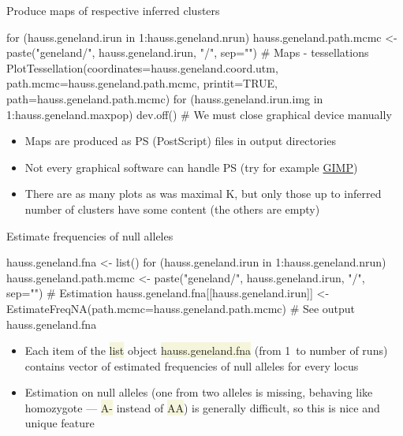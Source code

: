 \documentclass[compress, ucs, xelatex, 11pt, xcolor=svgnames, aspectratio=169,
	hyperref={
		bookmarks=true,
		unicode=true,
		colorlinks=true,
		pdftitle={Molecular data in R},
		plainpages=false,
		pdfauthor={Vojtech Zeisek},
		pdfsubject={Course about phylogeny and evolution in R},
		pdfcreator={XeLaTeX},
		pdfkeywords={R, evolution, phylogeny, molecular data},
		linkcolor=Crimson, %
		anchorcolor=Magenta, %
		citecolor=Magenta, %
		filecolor=Magenta, %
		menucolor=Magenta, %
		urlcolor=DodgerBlue, %
		pdftex},
	url={hyphens, lowtilde} %
	]{beamer}
\renewcommand{\texttt}[1]{\colorbox{Beige}{{\ttfamily #1}}}
\begin{document}
\begin{frame}[fragile]{Produce maps of respective inferred clusters}
	\begin{spluscode}
    for (hauss.geneland.irun in 1:hauss.geneland.nrun) {
      hauss.geneland.path.mcmc <- paste("geneland/",
        hauss.geneland.irun, "/", sep="")
      # Maps - tessellations
      PlotTessellation(coordinates=hauss.geneland.coord.utm,
        path.mcmc=hauss.geneland.path.mcmc, printit=TRUE,
        path=hauss.geneland.path.mcmc)
      for (hauss.geneland.irun.img in 1:hauss.geneland.maxpop) {
        dev.off() } # We must close graphical device manually
      }
	\end{spluscode}
	\begin{itemize}
		\item Maps are produced as PS (PostScript) files in output directories
		\item Not every graphical software can handle PS (try for example \href{https://www.gimp.org/}{GIMP})
		\item There are as many plots as was maximal K, but only those up to inferred number of clusters have some content (the others are empty)
	\end{itemize}
\end{frame}

\begin{frame}[fragile]{Estimate frequencies of null alleles}
	\begin{spluscode}
    hauss.geneland.fna <- list()
    for (hauss.geneland.irun in 1:hauss.geneland.nrun) {
      hauss.geneland.path.mcmc <- paste("geneland/", hauss.geneland.irun,
        "/", sep="")
      # Estimation
      hauss.geneland.fna[[hauss.geneland.irun]] <-
        EstimateFreqNA(path.mcmc=hauss.geneland.path.mcmc)
      }
    # See output
    hauss.geneland.fna
	\end{spluscode}
	\begin{itemize}
		\item Each item of the \texttt{list} object \texttt{hauss.geneland.fna} (from 1~to number of runs) contains vector of estimated frequencies of null alleles for every locus
		\item Estimation on null alleles (one from two alleles is missing, behaving like homozygote --- \texttt{A-} instead of \texttt{AA}) is generally difficult, so this is nice and unique feature
	\end{itemize}
\end{frame}
\end{document}
